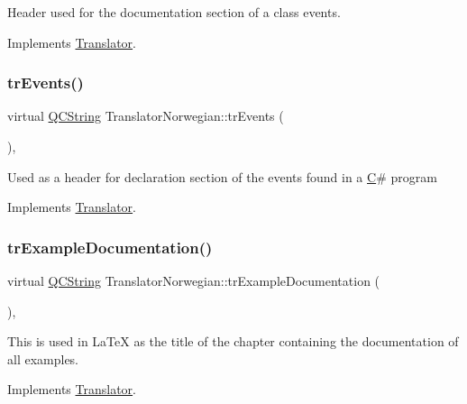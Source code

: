 Header used for the documentation section of a class\textquotesingle{} events. 

Implements \mbox{\hyperlink{class_translator}{Translator}}.

\mbox{\label{class_translator_norwegian_aa4affc21a7a8d6367dc1f1069316cc35}} 
\subsubsection{\texorpdfstring{trEvents()}{trEvents()}}
{\footnotesize\ttfamily virtual \mbox{\hyperlink{class_q_c_string}{Q\+C\+String}} Translator\+Norwegian\+::tr\+Events (\begin{DoxyParamCaption}{ }\end{DoxyParamCaption})\hspace{0.3cm}{\ttfamily [inline]}, {\ttfamily [virtual]}}

Used as a header for declaration section of the events found in a \mbox{\hyperlink{class_c}{C}}\# program 

Implements \mbox{\hyperlink{class_translator}{Translator}}.

\mbox{\label{class_translator_norwegian_a8b0d3f953b275be330604a73f4d2367e}} 
\subsubsection{\texorpdfstring{trExampleDocumentation()}{trExampleDocumentation()}}
{\footnotesize\ttfamily virtual \mbox{\hyperlink{class_q_c_string}{Q\+C\+String}} Translator\+Norwegian\+::tr\+Example\+Documentation (\begin{DoxyParamCaption}{ }\end{DoxyParamCaption})\hspace{0.3cm}{\ttfamily [inline]}, {\ttfamily [virtual]}}

This is used in La\+TeX as the title of the chapter containing the documentation of all examples. 

Implements \mbox{\hyperlink{class_translator}{Translator}}.

